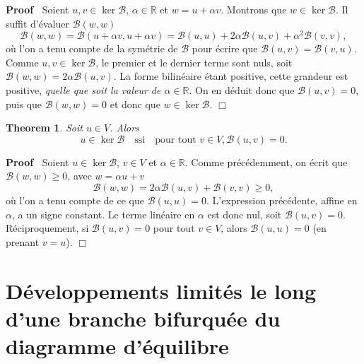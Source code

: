 \documentclass{article}
\newcommand{\tmem}[1]{{\em #1\/}}
\newenvironment{proof}{\noindent\textbf{Proof\ }}{\hspace*{\fill}$\Box$\medskip}
\newtheorem{theorem}{Theorem}
\begin{document}
\begin{proof}
  Soient $u, v \in \ker \mathcal{B}$, $\alpha \in \mathbb{R}$ et $w = u +
  \alpha v$. Montrons que $w \in \ker \mathcal{B}$. Il suffit d'{\'e}valuer
  $\mathcal{B} (w, w)$
  \begin{equation}
    \mathcal{B} (w, w) =\mathcal{B} (u + \alpha v, u + \alpha v) =\mathcal{B}
    (u, u) + 2 \alpha \mathcal{B} (u, v) + \alpha^2 \mathcal{B} (v, v),
  \end{equation}
  o{\`u} l'on a tenu compte de la sym{\'e}trie de $\mathcal{B}$ pour
  {\'e}crire que $\mathcal{B} (u, v) =\mathcal{B} (v, u)$. Comme $u, v \in
  \ker \mathcal{B}$, le premier et le dernier terme sont nuls, soit
  $\mathcal{B} (w, w) = 2 \alpha \mathcal{B} (u, v)$. La forme bilin{\'e}aire
  {\'e}tant positive, cette grandeur est positive, {\tmem{quelle que soit la
  valeur de $\alpha \in \mathbb{R}$}}. On en d{\'e}duit donc que $\mathcal{B}
  (u, v) = 0$, puis que $\mathcal{B} (w, w) = 0$ et donc que $w \in \ker
  \mathcal{B}.$
\end{proof}

\begin{theorem}
  Soit $u \in V$. Alors
  \begin{equation}
    u \in \ker \mathcal{B} \quad \text{ssi} \quad \text{pour tout } v \in V,
    \mathcal{B} (u, v) = 0.
  \end{equation}
\end{theorem}

\begin{proof}
  Soient $u \in \ker \mathcal{B}$, $v \in V$ et $\alpha \in \mathbb{R}$. Comme
  pr{\'e}c{\'e}demment, on {\'e}crit que $\mathcal{B} (w, w) \geq 0$, avec $w
  = \alpha u + v$
  \begin{equation}
    \mathcal{B} (w, w) = 2 \alpha \mathcal{B} (u, v) +\mathcal{B} (v, v) \geq
    0,
  \end{equation}
  o{\`u} l'on a tenu compte de ce que $\mathcal{B} (u, u) = 0$. L'expression
  pr{\'e}c{\'e}dente, affine en $\alpha$, a un signe constant. Le terme
  lin{\'e}aire en $\alpha$ est donc nul, soit $\mathcal{B} (u, v) = 0$.
  R{\'e}ciproquement, si $\mathcal{B} (u, v) = 0$ pour tout $v \in V$, alors
  $\mathcal{B} (u, u) = 0$ (en prenant $v = u$).
\end{proof}

\section{D{\'e}veloppements limit{\'e}s le long d'une branche bifurqu{\'e}e du
diagramme d'{\'e}quilibre}
\end{document}
